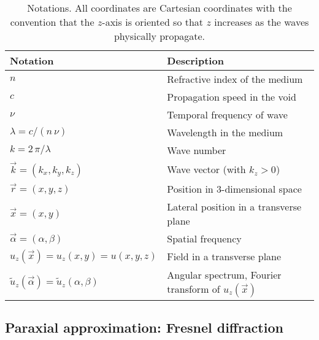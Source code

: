 \documentclass[a4paper]{article}
\newcommand*{\FT}[1]{\widetilde{#1}}
\begin{document}
\begin{table}[t]
  \centering
  \begin{tabular}{ll}
    Notation & Description \\
    \hline
    $n$ & Refractive index of the medium\\
    $c$ & Propagation speed in the void\\
    $ν$ & Temporal frequency of wave\\
    $λ= c/(n\,ν)$ & Wavelength in the medium\\
    $k = 2\,π/λ$ & Wave number\\
    $\vec{k} = (k_{x},k_{y},k_{z})$ & Wave vector (with $k_{z} > 0$)\\
    $\vec{r} = (x,y,z)$ & Position in 3-dimensional space\\
    $\vec{x} = (x,y)$ & Lateral position in a transverse plane\\
    $\vec{α} = (α,β)$ & Spatial frequency\\
    $u_{z}(\vec{x}) = u_{z}(x,y) = u(x,y,z)$ & Field in a transverse plane\\
    $\FT{u}_{z}(\vec{α}) = \FT{u}_{z}(α,β)$
             & Angular spectrum, Fourier transform of $u_{z}(\vec{x})$\\
  \end{tabular}
  \caption{Notations. All coordinates are Cartesian coordinates with the
    convention that the $z$-axis is oriented so that $z$ increases as the waves
    physically propagate.}
  \label{tab:notations}
\end{table}


\subsection{Paraxial approximation: Fresnel diffraction}
\label{sec:Fresnel-diffraction}
\end{document}
